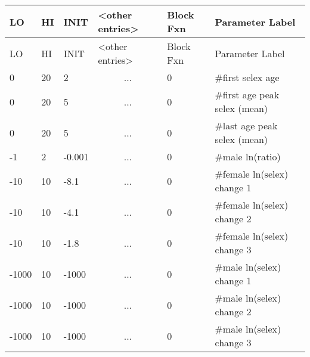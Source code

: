 	\begin{longtable}{p{1cm} p{1cm} p{1cm} p{2.9cm}  p{1.8cm}  p{5.1cm}}
		\hline
		LO \Tstrut & HI & INIT  &  <other entries> & Block Fxn & Parameter Label\Bstrut\\
		\hline
		\endfirsthead
		
		\hline
		LO \Tstrut & HI & INIT & <other entries> & Block Fxn & Parameter Label\Bstrut\\
		\hline
		\endhead

		0     & 20 &  2     &  \multicolumn{1}{c}{...} & 0 & \#first selex age \Tstrut\\
		0     & 20 &  5     &  \multicolumn{1}{c}{...} & 0 & \#first age peak selex (mean) \\
		0     & 20 &  5     &  \multicolumn{1}{c}{...} & 0 & \#last age peak selex (mean) \\
		-1    &  2 & -0.001 &  \multicolumn{1}{c}{...} & 0 & \#male ln(ratio) \\
		-10   & 10 & -8.1   &  \multicolumn{1}{c}{...} & 0 & \#female ln(selex) change 1\\
		-10   & 10 & -4.1   &  \multicolumn{1}{c}{...} & 0 & \#female ln(selex) change 2\\
		-10   & 10 & -1.8   &  \multicolumn{1}{c}{...} & 0 & \#female ln(selex) change 3\\
		-1000 & 10 & -1000  &  \multicolumn{1}{c}{...} & 0 & \#male ln(selex) change 1\\
		-1000 & 10 & -1000  &  \multicolumn{1}{c}{...} & 0 & \#male ln(selex) change 2\\
		-1000 & 10 & -1000  &  \multicolumn{1}{c}{...} & 0 & \#male ln(selex) change 3\Bstrut\\
		\hline
	\end{longtable}



